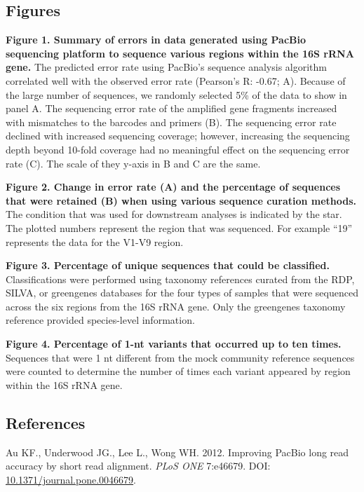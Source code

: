 \documentclass[11pt,]{article}
\begin{document}
\newpage

\subsection{Figures}\label{figures}

\textbf{Figure 1. Summary of errors in data generated using PacBio
sequencing platform to sequence various regions within the 16S rRNA
gene.} The predicted error rate using PacBio's sequence analysis
algorithm correlated well with the observed error rate (Pearson's R:
-0.67; A). Because of the large number of sequences, we randomly
selected 5\% of the data to show in panel A. The sequencing error rate
of the amplified gene fragments increased with mismatches to the
barcodes and primers (B). The sequencing error rate declined with
increased sequencing coverage; however, increasing the sequencing depth
beyond 10-fold coverage had no meaningful effect on the sequencing error
rate (C). The scale of they y-axis in B and C are the same.

\textbf{Figure 2. Change in error rate (A) and the percentage of
sequences that were retained (B) when using various sequence curation
methods.} The condition that was used for downstream analyses is
indicated by the star. The plotted numbers represent the region that was
sequenced. For example ``19'' represents the data for the V1-V9 region.

\textbf{Figure 3. Percentage of unique sequences that could be
classified.} Classifications were performed using taxonomy references
curated from the RDP, SILVA, or greengenes databases for the four types
of samples that were sequenced across the six regions from the 16S rRNA
gene. Only the greengenes taxonomy reference provided species-level
information.

\textbf{Figure 4. Percentage of 1-nt variants that occurred up to ten
times.} Sequences that were 1 nt different from the mock community
reference sequences were counted to determine the number of times each
variant appeared by region within the 16S rRNA gene.

\newpage

\subsection*{References}\label{references}

\hypertarget{refs}{}
\hypertarget{ref-Au2012}{}
Au KF., Underwood JG., Lee L., Wong WH. 2012. Improving PacBio long read
accuracy by short read alignment. \emph{PLoS ONE} 7:e46679. DOI:
\href{https://doi.org/10.1371/journal.pone.0046679}{10.1371/journal.pone.0046679}.
\end{document}
